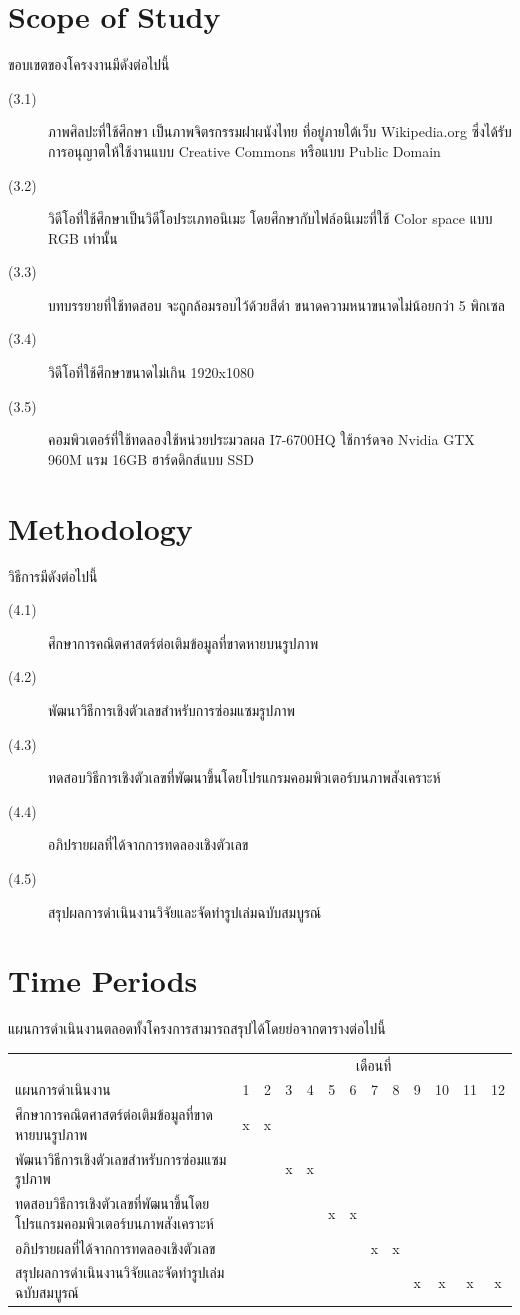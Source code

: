 \documentclass[hidelinks,a4paper,14pt]{article}
\numberwithin{equation}{section}							%
\begin{document}
{\section{Scope of Study}
ขอบเขตของโครงงานมีดังต่อไปนี้
\begin{description}
\item[(3.1)] ภาพศิลปะที่ใช้ศึกษา เป็นภาพจิตรกรรมฝาผนังไทย ที่อยู่ภายใต้เว็บ Wikipedia.org ซึ่งได้รับการอนุญาตให้ใช้งานแบบ Creative Commons หรือแบบ Public Domain
\item[(3.2)] วิดีโอที่ใช้ศึกษาเป็นวิดีโอประเภทอนิเมะ โดยศึกษากับไฟล์อนิเมะที่ใช้ Color space แบบ RGB เท่านั้น
\item[(3.3)] บทบรรยายที่ใช้ทดสอบ จะถูกล้อมรอบไว้ด้วยสีดำ ขนาดความหนาขนาดไม่น้อยกว่า 5 พิกเซล
\item[(3.4)] วิดีโอที่ใช้ศึกษาขนาดไม่เกิน 1920x1080
\item[(3.5)] คอมพิวเตอร์ที่ใช้ทดลองใช้หน่วยประมวลผล I7-6700HQ ใช้การ์ดจอ Nvidia GTX 960M แรม 16GB ฮาร์ดดิกส์แบบ SSD
\end{description}

\section{Methodology}
วิธีการมีดังต่อไปนี้
\begin{description}
	\item[(4.1)] ศึกษาการคณิตศาสตร์ต่อเติมข้อมูลที่ขาดหายบนรูปภาพ
	\item[(4.2)] พัฒนาวิธีการเชิงตัวเลขสำหรับการซ่อมแซมรูปภาพ
	\item[(4.3)] ทดสอบวิธีการเชิงตัวเลขที่พัฒนาขึ้นโดยโปรแกรมคอมพิวเตอร์บนภาพสังเคราะห์
	\item[(4.4)] อภิปรายผลที่ได้จากการทดลองเชิงตัวเลข
	\item[(4.5)] สรุปผลการดำเนินงานวิจัยและจัดทำรูปเล่มฉบับสมบูรณ์
\end{description}
\section{Time Periods}
แผนการดำเนินงานตลอดทั้งโครงการสามารถสรุปได้โดยย่อจากตารางต่อไปนี้
\begin{center}
	\begin{tabular}[ht]{|l|c|c|c|c|c|c|c|c|c|c|c|c|}
		\hline
		&\multicolumn{12}{c|}{เดือนที่}\\
		\cline{2-13}
		แผนการดำเนินงาน&1&2&3&4&5&6&7&8&9&10&11&12\\
		\hline
		ศึกษาการคณิตศาสตร์ต่อเติมข้อมูลที่ขาดหายบนรูปภาพ&x&x& & & & & & & & & &\\
		พัฒนาวิธีการเชิงตัวเลขสำหรับการซ่อมแซมรูปภาพ& & &x&x& & & & & & & &\\
		ทดสอบวิธีการเชิงตัวเลขที่พัฒนาขึ้นโดยโปรแกรมคอมพิวเตอร์บนภาพสังเคราะห์& & & & &x&x& & & & & &\\
		อภิปรายผลที่ได้จากการทดลองเชิงตัวเลข & & & & & & &x&x& & & &\\
		สรุปผลการดำเนินงานวิจัยและจัดทำรูปเล่มฉบับสมบูรณ์& & & & & & & & &x&x&x&x\\
		\hline
	\end{tabular}
\end{center}




}
\end{document}
